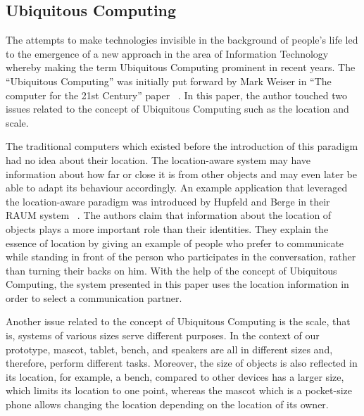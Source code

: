 \subsection{Ubiquitous Computing}
\label{sec:Ubiquitous Computing}
The attempts to make technologies invisible in the background of people’s life led to the emergence of a new approach in the area of Information Technology whereby making the term Ubiquitous Computing prominent in recent years. The “Ubiquitous Computing” was initially put forward by Mark Weiser in “The computer for the 21st Century” paper ~\cite{weiser2002computer}. In this paper, the author touched two issues related to the concept of Ubiquitous Computing such as the location and scale.
\par The traditional computers which existed before the introduction of this paradigm had no idea about their location. The location-aware system may have information about how far or close it is from other objects and may even later be able to adapt its behaviour accordingly. An example application that leveraged the location-aware paradigm was introduced by Hupfeld and Berge in their RAUM system ~\cite{hupfeld2000spatially}. The authors claim that information about the location of objects plays a more important role than their identities. They explain the essence of location by giving an example of people who prefer to communicate while standing in front of the person who participates in the conversation, rather than turning their backs on him. With the help of the concept of Ubiquitous Computing, the system presented in this paper uses the location information in order to select a communication partner.
\par Another issue related to the concept of Ubiquitous Computing is the scale, that is, systems of various sizes serve different purposes. In the context of our prototype, mascot, tablet, bench, and speakers are all in different sizes and, therefore, perform different tasks. Moreover, the size of objects is also reflected in its location, for example, a bench, compared to other devices has a larger size, which limits its location to one point, whereas the mascot which is a pocket-size phone allows changing the location depending on the location of its owner.


